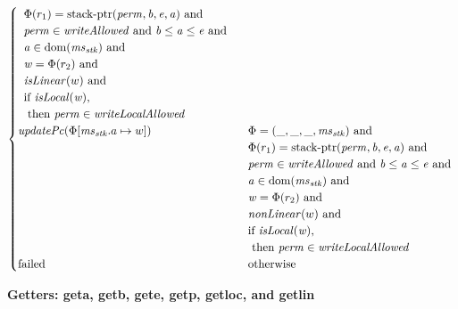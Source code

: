 \documentclass[a4paper]{article}
\newcommand{\dom}{\mathrm{dom}}
\newcommand{\tand}{\text{ and }}
\newcommand{\totherwise}{\text{otherwise }}
\newcommand{\update}[2]{[#1 \mapsto #2]}
\newcommand{\perm}{\var{perm}}
\newcommand{\stkptr}[1]{\mathrm{stack\text{-}ptr}(#1)}
\newcommand{\failed}{\mathrm{failed}}
\newcommand{\var}[1]{\mathit{#1}}
\newcommand{\ms}{\var{ms}}
\newcommand{\stk}{\var{stk}}
\newcommand{\baddr}{\var{b}}
\newcommand{\eaddr}{\var{e}}
\newcommand{\aaddr}{\var{a}}
\newcommand{\plainfun}[2]{
  \ifthenelse{\equal{#2}{}}
  {\mathit{#1}}
  {\mathit{#1}(#2)}
}
\newcommand{\updPcAddr}[1]{\plainfun{updatePc}{#1}}
\newcommand{\writeAllowed}[1]{\plainfun{writeAllowed}{#1}}
\newcommand{\writeLocalAllowed}[1]{\plainfun{writeLocalAllowed}{#1}}
\newcommand{\nonLinear}[1]{\plainfun{nonLinear}{#1}}
\newcommand{\isLoc}[1]{\plainfun{isLocal}{#1}}
\newcommand{\isLinear}[1]{\plainfun{isLinear}{#1}}
\begin{document}
\begin{align*}
\begin{cases}
\begin{array}[t]{l}
                                   \Phi(r_1) = \stkptr{\perm,\baddr,\eaddr,\aaddr} \tand \\
                                   \perm \in \writeAllowed{} \tand \baddr \leq \aaddr \leq \eaddr \tand \\
                                   \aaddr \in \dom(\ms_\stk) \tand \\
                                   \var{w} = \Phi(r_2) \tand \\
                                   \isLinear{w} \tand \\
                                   \text{if } \isLoc{\var{w}} \text{,} \\
                                   \text{ then } \perm \in \writeLocalAllowed{}
                                 \end{array} \\
                                 \updPcAddr{\Phi\update{\ms_\stk.a}{w}} & 
                                 \arraycolsep=0pt
                                 \begin{array}[t]{l}
                                   \Phi = (\_, \_, \_, \ms_\stk) \tand \\
                                   \Phi(r_1) = \stkptr{\perm,\baddr,\eaddr,\aaddr} \tand \\
                                   \perm \in \writeAllowed{} \tand \baddr \leq \aaddr \leq \eaddr \tand \\
                                   \aaddr \in \dom(\ms_\stk) \tand \\
                                   \var{w} = \Phi(r_2) \tand \\
                                   \nonLinear{w} \tand \\
                                   \text{if } \isLoc{\var{w}} \text{,} \\
                                   \text{ then } \perm \in \writeLocalAllowed{}
                                 \end{array} \\
                                 \failed & \totherwise
                               \end{cases}
\end{align*}

\textbf{Getters: geta, getb, gete, getp, getloc, and getlin}
\end{document}
